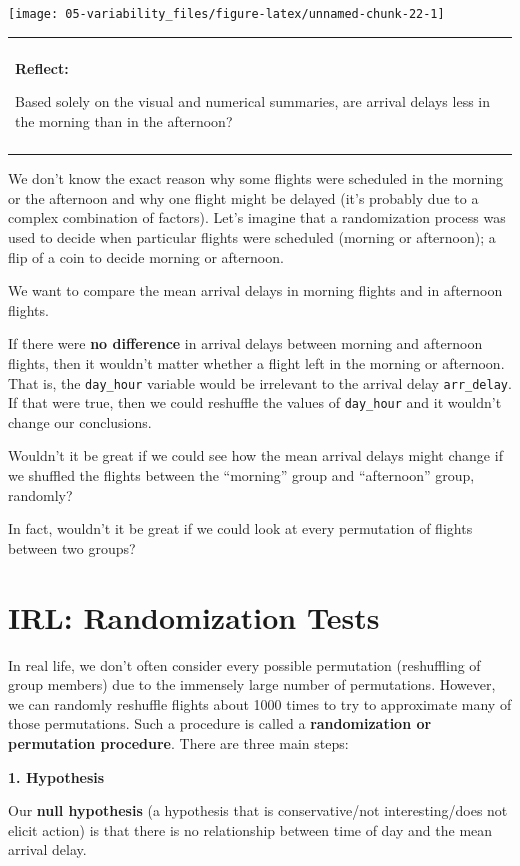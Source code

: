 \documentclass[
]{book}
\newenvironment{reflect}
{
    \begin{center}
    
    \begin{tabular}{|p{0.8\textwidth}|}
    \rowcolor{LightBlue}
    \hline\\
    \rowcolor{LightBlue}
    \textbf{Reflect:}
}
{
    \\\rowcolor{LightBlue}
    \\\hline
    \end{tabular} 
    \end{center}
}
\begin{document}
\begin{center}\texttt{[image: 05-variability\_files/figure-latex/unnamed-chunk-22-1]} \end{center}

\begin{reflect}
Based solely on the visual and numerical summaries, are arrival delays
less in the morning than in the afternoon?
\end{reflect}

We don't know the exact reason why some flights were scheduled in the morning or the afternoon and why one flight might be delayed (it's probably due to a complex combination of factors). Let's imagine that a randomization process was used to decide when particular flights were scheduled (morning or afternoon); a flip of a coin to decide morning or afternoon.

We want to compare the mean arrival delays in morning flights and in afternoon flights.

If there were \textbf{no difference} in arrival delays between morning and afternoon flights, then it wouldn't matter whether a flight left in the morning or afternoon. That is, the \texttt{day\_hour} variable would be irrelevant to the arrival delay \texttt{arr\_delay}. If that were true, then we could reshuffle the values of \texttt{day\_hour} and it wouldn't change our conclusions.

Wouldn't it be great if we could see how the mean arrival delays might change if we shuffled the flights between the ``morning'' group and ``afternoon'' group, randomly?

In fact, wouldn't it be great if we could look at every permutation of flights between two groups?

\hypertarget{irl-randomization-tests}{%
\section{IRL: Randomization Tests}\label{irl-randomization-tests}}

In real life, we don't often consider every possible permutation (reshuffling of group members) due to the immensely large number of permutations. However, we can randomly reshuffle flights about 1000 times to try to approximate many of those permutations. Such a procedure is called a \textbf{randomization or permutation procedure}. There are three main steps:

\textbf{1. Hypothesis}

Our \textbf{null hypothesis} (a hypothesis that is conservative/not interesting/does not elicit action) is that there is no relationship between time of day and the mean arrival delay.
\end{document}
